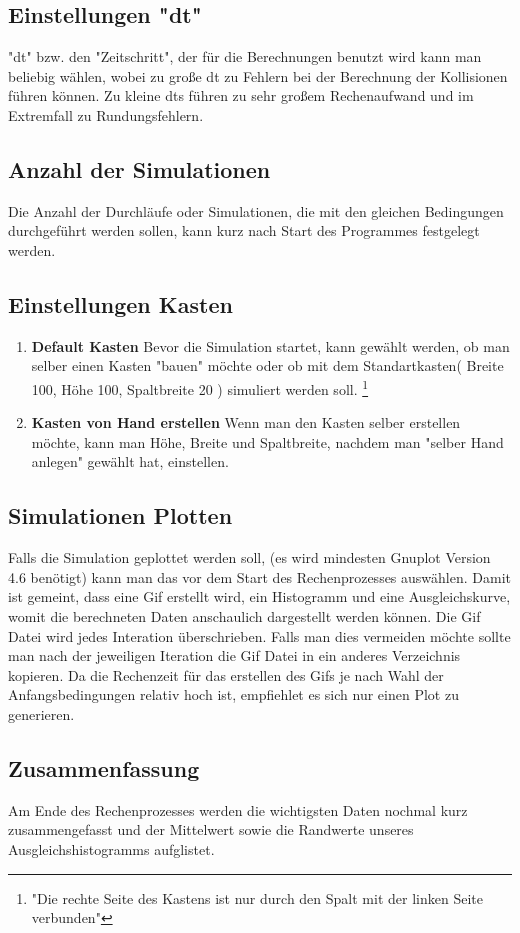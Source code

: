 \documentclass[14pt,a4paper]{scrartcl}
\begin{document}
\subsection{Einstellungen "dt" }
"dt" bzw. den "Zeitschritt", der für die Berechnungen benutzt wird kann man beliebig wählen, wobei zu große dt zu Fehlern bei der Berechnung der Kollisionen führen können.
Zu kleine dts führen zu sehr großem Rechenaufwand und im Extremfall zu Rundungsfehlern.

\subsection{Anzahl der Simulationen}
Die Anzahl der Durchläufe oder Simulationen, die mit den gleichen Bedingungen durchgeführt werden sollen, kann kurz nach Start des Programmes festgelegt werden.

\subsection{Einstellungen Kasten}
\begin{enumerate}

\item \textbf{Default Kasten}
\newline
Bevor die Simulation startet, kann gewählt werden, ob man selber einen Kasten "bauen" möchte oder ob mit dem Standartkasten( Breite 100, Höhe 100, Spaltbreite 20 ) simuliert werden soll.
\footnote{"Die rechte Seite des Kastens ist nur durch den Spalt mit der linken Seite verbunden"}
\item \textbf{Kasten von Hand erstellen}
\newline
Wenn man den Kasten selber erstellen möchte, kann man Höhe, Breite und Spaltbreite, nachdem man "selber Hand anlegen" gewählt hat, einstellen.

\end{enumerate}

\subsection{Simulationen Plotten}
Falls die Simulation geplottet werden soll, (es wird mindesten Gnuplot Version 4.6 benötigt)
kann man das vor dem Start des Rechenprozesses auswählen.
Damit ist gemeint, dass eine Gif erstellt wird, ein Histogramm und eine Ausgleichskurve, womit die berechneten Daten anschaulich dargestellt werden können.
Die Gif Datei wird jedes Interation überschrieben.
Falls man dies vermeiden möchte sollte man nach der jeweiligen Iteration die Gif Datei in ein anderes Verzeichnis kopieren.
Da die Rechenzeit für das erstellen des Gifs je nach Wahl der Anfangsbedingungen relativ hoch ist, empfiehlet es sich nur einen Plot zu generieren.

\subsection{Zusammenfassung}
Am Ende des Rechenprozesses werden die wichtigsten Daten nochmal kurz zusammengefasst und der Mittelwert sowie die Randwerte unseres Ausgleichshistogramms aufglistet.
\end{document}
